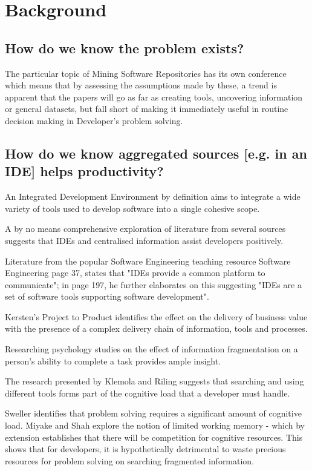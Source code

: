 \chapter{Background}
\section{How do we know the problem exists?}

The particular topic of Mining Software Repositories has its own conference \parencite{Storey:2019:3341883} which means that by assessing the assumptions made by these, a trend is apparent that the papers will go as far as creating tools, uncovering information or general datasets, but fall short of making it immediately useful in routine decision making in Developer's problem solving.

\section{How do we know aggregated sources [e.g. in an IDE] helps productivity?}

An Integrated Development Environment by definition aims to integrate a wide variety of tools used to develop software into a single cohesive scope. 

A by no means comprehensive exploration of literature from several sources suggests that IDEs and centralised information assist developers positively. 

Literature from the popular Software Engineering teaching resource Software Engineering \parencite{Sommerville:2010:SE:1841764} page 37, states that "IDEs provide a common platform to communicate"; in page 197, he further elaborates on this suggesting "IDEs are a set of software tools supporting software development".

Kersten's Project to Product \parencite*{kersten2018projecproduct} identifies the effect on the delivery of business value with the presence of a complex delivery chain of information, tools and processes.

Researching psychology studies on the effect of information fragmentation on a person's ability to complete a task provides ample insight. 

The research presented by Klemola and Riling \parencite*{klemola2002modeling} suggests that searching and using different tools forms part of the cognitive load that a developer must handle.

Sweller \parencite*{sweller1998cognitive} identifies that problem solving requires a significant amount of cognitive load. Miyake and Shah \parencite*{miyake1999models} explore the notion of limited working memory - which by extension establishes that there will be competition for cognitive resources. This shows that for developers, it is hypothetically detrimental to waste precious resources for problem solving on searching fragmented information.


